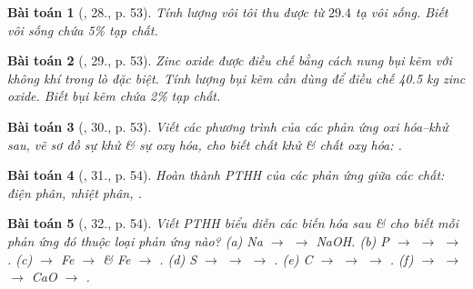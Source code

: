 \documentclass{article}
\newtheorem{baitoan}{Bài toán}
\begin{document}
\begin{baitoan}[\cite{An_Hoa_Hoc_nang_cao_8_9}, 28., p. 53]
	Tính lượng vôi tôi thu được từ $29.4$ tạ vôi sống. Biết vôi sống chứa {\rm5\%} tạp chất.
\end{baitoan}

\begin{baitoan}[\cite{An_Hoa_Hoc_nang_cao_8_9}, 29., p. 53]
	Zinc oxide được điều chế bằng cách nung bụi kẽm với không khí trong lò đặc biệt. Tính lượng bụi kẽm cần dùng để điều chế {\rm40.5 kg} zinc oxide. Biết bụi kẽm chứa {\rm2\%} tạp chất.
\end{baitoan}

\begin{baitoan}[\cite{An_Hoa_Hoc_nang_cao_8_9}, 30., p. 53]
	Viết các phương trình của các phản ứng oxi hóa--khử sau, vẽ sơ đồ sự khử \& sự oxy hóa, cho biết chất khử \& chất oxy hóa: {\rm{}}.
\end{baitoan}

\begin{baitoan}[\cite{An_Hoa_Hoc_nang_cao_8_9}, 31., p. 54]
	Hoàn thành {\rm PTHH} của các phản ứng giữa các chất: {\rm{} điện phân,  nhiệt phân, }.
\end{baitoan}

\begin{baitoan}[\cite{An_Hoa_Hoc_nang_cao_8_9}, 32., p. 54]
	Viết {\rm PTHH} biểu diễn các biến hóa sau \& cho biết mỗi phản ứng đó thuộc loại phản ứng nào? {\rm(a) Na $\to$  $\to$ NaOH. (b) P $\to$  $\to$  $\to$ . (c)  $\to$ Fe $\to$  \& Fe $\to$ . (d) S $\to$  $\to$  $\to$ . (e) C $\to$  $\to$  $\to$  . (f)  $\to$  $\to$  $\to$ CaO $\to$ }.
\end{baitoan}


\printbibliography[heading=bibintoc]
\end{document}
